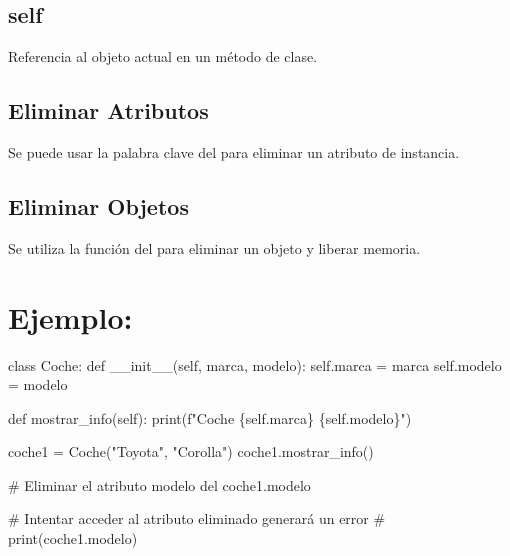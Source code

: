 \documentclass[
  a4paper,
  DIV=11,
  numbers=noendperiod,
  onepage,
  openany]{scrreprt}
\newenvironment{Shaded}{\begin{snugshade}}{\end{snugshade}}
\newcommand{\BuiltInTok}[1]{\textcolor[rgb]{0.00,0.23,0.31}{#1}}
\newcommand{\CommentTok}[1]{\textcolor[rgb]{0.37,0.37,0.37}{#1}}
\newcommand{\FunctionTok}[1]{\textcolor[rgb]{0.28,0.35,0.67}{#1}}
\newcommand{\KeywordTok}[1]{\textcolor[rgb]{0.00,0.23,0.31}{#1}}
\newcommand{\NormalTok}[1]{\textcolor[rgb]{0.00,0.23,0.31}{#1}}
\newcommand{\OperatorTok}[1]{\textcolor[rgb]{0.37,0.37,0.37}{#1}}
\newcommand{\SpecialCharTok}[1]{\textcolor[rgb]{0.37,0.37,0.37}{#1}}
\newcommand{\SpecialStringTok}[1]{\textcolor[rgb]{0.13,0.47,0.30}{#1}}
\newcommand{\StringTok}[1]{\textcolor[rgb]{0.13,0.47,0.30}{#1}}
\newcommand{\VariableTok}[1]{\textcolor[rgb]{0.07,0.07,0.07}{#1}}
\begin{document}
\hypertarget{self-1}{%
\subsection{self}\label{self-1}}

Referencia al objeto actual en un método de clase.

\hypertarget{eliminar-atributos-1}{%
\subsection{Eliminar Atributos}\label{eliminar-atributos-1}}

Se puede usar la palabra clave del para eliminar un atributo de
instancia.

\hypertarget{eliminar-objetos-1}{%
\subsection{Eliminar Objetos}\label{eliminar-objetos-1}}

Se utiliza la función del para eliminar un objeto y liberar memoria.

\hypertarget{ejemplo-55}{%
\section{Ejemplo:}\label{ejemplo-55}}

\begin{Shaded}
\begin{Highlighting}[]
\KeywordTok{class}\NormalTok{ Coche:}
    \KeywordTok{def} \FunctionTok{\_\_init\_\_}\NormalTok{(}\VariableTok{self}\NormalTok{, marca, modelo):}
        \VariableTok{self}\NormalTok{.marca }\OperatorTok{=}\NormalTok{ marca}
        \VariableTok{self}\NormalTok{.modelo }\OperatorTok{=}\NormalTok{ modelo}

    \KeywordTok{def}\NormalTok{ mostrar\_info(}\VariableTok{self}\NormalTok{):}
        \BuiltInTok{print}\NormalTok{(}\SpecialStringTok{f"Coche }\SpecialCharTok{\{}\VariableTok{self}\SpecialCharTok{.}\NormalTok{marca}\SpecialCharTok{\}}\SpecialStringTok{ }\SpecialCharTok{\{}\VariableTok{self}\SpecialCharTok{.}\NormalTok{modelo}\SpecialCharTok{\}}\SpecialStringTok{"}\NormalTok{)}

\NormalTok{coche1 }\OperatorTok{=}\NormalTok{ Coche(}\StringTok{"Toyota"}\NormalTok{, }\StringTok{"Corolla"}\NormalTok{)}
\NormalTok{coche1.mostrar\_info()}

\CommentTok{\# Eliminar el atributo \textquotesingle{}modelo\textquotesingle{}}
\KeywordTok{del}\NormalTok{ coche1.modelo}

\CommentTok{\# Intentar acceder al atributo eliminado generará un error}
\CommentTok{\# print(coche1.modelo)}
\end{Highlighting}
\end{Shaded}
\end{document}
